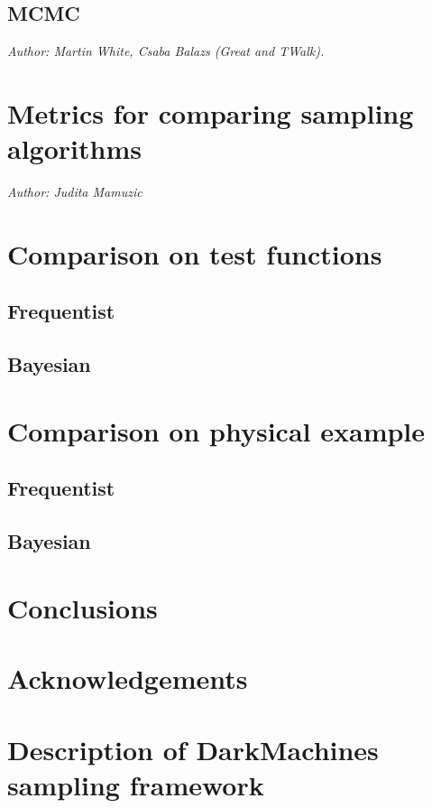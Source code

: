 \documentclass[12pt]{JHEP3}
\begin{document}
\subsection{MCMC}

\emph{Author: Martin White, Csaba Balazs (Great and TWalk).} 

\section{Metrics for comparing sampling algorithms}
\label{sec:metrics}
\emph{Author: Judita Mamuzic}

\section{Comparison on test functions}
\label{sec:test}
\subsection{Frequentist}
\subsection{Bayesian}

\section{Comparison on physical example}
\label{sec:physics}
\subsection{Frequentist}
\subsection{Bayesian}

\section{Conclusions}\label{Conclusions}
\label{sec:conclusions}
\section{Acknowledgements}



\appendix
\section{Description of DarkMachines sampling framework}
\label{app:python}
\end{document}

